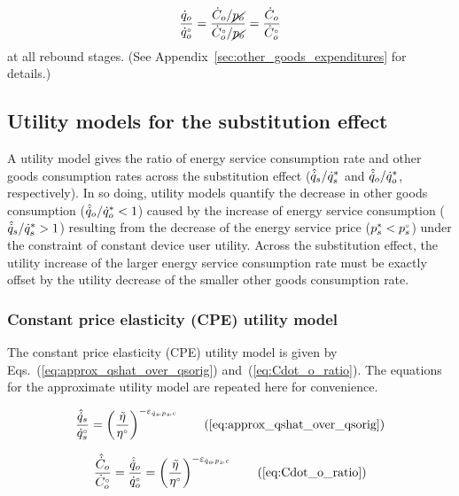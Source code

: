 \documentclass[12pt]{article}\usepackage[]{graphicx}\usepackage[]{xcolor}
\begin{document}
\begin{equation} \label{eq:exogenous_p_o}
  \frac{\dot{q}_o}{{}{\dot{q}}^{\scriptscriptstyle \circ}_o} 
      = \frac{\dot{C}_o/\cancel{p_o}}{{}{\dot{C}}^{\scriptscriptstyle \circ}_o/\cancel{p_o}} 
      = \frac{\dot{C}_o}{{}{\dot{C}}^{\scriptscriptstyle \circ}_o}
\end{equation}
%
at all rebound stages. 
(See Appendix~\ref{sec:other_goods_expenditures} for details.)


\subsection{Utility models for the substitution effect}
\label{sec:utility_models_sub}

A utility model gives the ratio of energy service consumption rate 
and other goods consumption rates across the substitution effect
($\hat{\dot{q}}_s/{\dot{q}}^*_s$ and 
$\hat{\dot{q}}_o/{\dot{q}}^*_o$, 
respectively).
In so doing, 
utility models quantify the decrease in other goods consumption
($\hat{\dot{q}}_o/{\dot{q}}^*_o < 1$)
caused by the increase of energy service consumption
($\hat{\dot{q}}_s/{\dot{q}}^*_s > 1$)
resulting from the decrease of the energy service price (${p}^*_s < {}{p}^{\scriptscriptstyle \circ}_s$)
under the constraint of constant device user utility.
Across the substitution effect, 
the utility increase of the larger energy service consumption rate
must be exactly offset
by the utility decrease of the smaller other goods consumption rate.


\subsubsection{Constant price elasticity (CPE) utility model} 
\label{sec:derivation_cpe_utility_model}

The constant price elasticity (CPE) utility model is given
by Eqs.~(\ref{eq:approx_qshat_over_qsorig})
and~(\ref{eq:Cdot_o_ratio}).
The equations for the approximate utility model are repeated here
for convenience.

\begin{equation} 
  \frac{\rasub{q}_s}{\rbempl{q}_s}
      = \left( \frac{\amacro{\eta}}{\bempl{\eta}} \right)^{-\eqspsC} 
        \tag{\ref{eq:approx_qshat_over_qsorig}}
\end{equation}

\begin{equation}
  \frac{\rasub{C}_o}{\rorig{C}_o}
      = \frac{\rasub{q}_o}{\rorig{q}_o}
      = \left( \frac{\amacro{\eta}}{\bempl{\eta}} \right)^{-\eqopsC} \tag{\ref{eq:Cdot_o_ratio}}
\end{equation}
\end{document}

